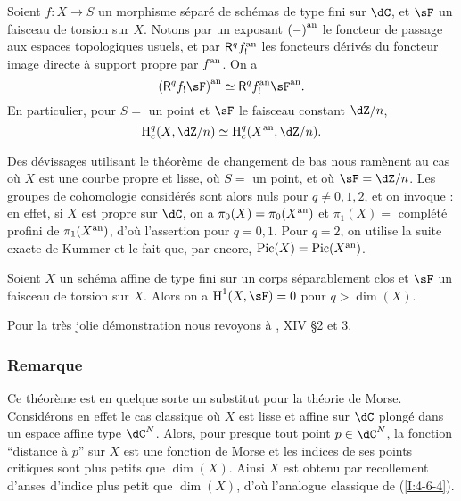 \begin{theorem}\label{I:4-6-3}
Soient $f:X\to S$ un morphisme séparé de schémas de type fini sur $\dC$, 
et $\sF$ un faisceau de torsion sur $X$. Notons par un exposant ${(-)}^{\textnormal{an}}$ le 
foncteur de passage aux espaces topologiques usuels, et par $\mathsf{R}^q {f}^{\textnormal{an}}_!$ les 
foncteurs dérivés du foncteur image directe à support propre par ${f}^{\textnormal{an}}$. On a 
\[
  \an{(\R^q f_! \sF)} \simeq \R^q \an f_! \an \sF \text{.}
\]
En particulier, pour $S=$ un point et $\sF$ le faisceau constant $\dZ/n$, 
\[
  \h_c^q(X,\dZ/n) \simeq \h_c^q(\an X,\dZ/n)\text{.}
\]
\end{theorem}

Des dévissages utilisant le théorème de changement de bas nous ramènent au 
cas où $X$ est une courbe propre et lisse, où $S=$ un point, et où 
$\sF=\dZ/n$. Les groupes de cohomologie considérés sont alors nuls pour 
$q\ne 0,1,2$, et on invoque \cite{se55}: en effet, si $X$ est propre sur $\dC$, 
on a $\pi_0(X) = \pi_0({X}^{\textnormal{an}})$ et $\pi_1(X) = $ complété profini de 
$\pi_1({X}^{\textnormal{an}})$, d'où l'assertion pour $q=0,1$. Pour $q=2$, on utilise la 
suite exacte de Kummer et le fait que, par \cite{se55} encore, 
$\operatorname{Pic}(X)=\operatorname{Pic}({X}^{\textnormal{an}})$. 





\begin{theorem}\label{I:4-6-4}
Soient $X$ un schéma affine de type fini sur un corps séparablement clos et 
$\sF$ un faisceau de torsion sur $X$. Alors on a $\h^1(X,\sF) = 0$ pour 
$q>\dim(X)$. 
\end{theorem}

Pour la très jolie démonstration nous revoyons à \cite{sga4}, XIV \S 2 et 3. 





\subsubsection{Remarque}\label{I:4-6-5}

Ce théorème est en quelque sorte un substitut pour la théorie de Morse. 
Considérons en effet le cas classique où $X$ est lisse et affine sur $\dC$ 
plongé dans un espace affine type $\dC^N$. Alors, pour presque tout point 
$p\in\dC^N$, la fonction ``distance à $p$'' sur $X$ est une fonction de Morse 
et les indices de ses points critiques sont plus petits que $\dim(X)$. Ainsi 
$X$ est obtenu par recollement d'anses d'indice plus petit que $\dim(X)$, d'où 
l'analogue classique de (\ref{I:4-6-4}). 




















